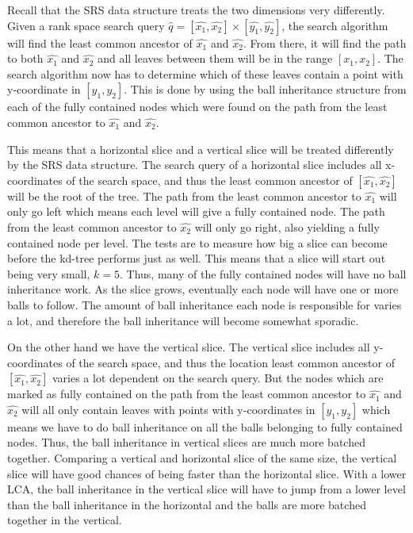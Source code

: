Recall that the SRS data structure treats the two dimensions very differently. Given a rank space search query $\hat{q} = [\hat{x_1}, \hat{x_2}] \times [\hat{y_1}, \hat{y_2}]$, the search algorithm will find the least common ancestor of $\hat{x_1}$ and $\hat{x_2}$. From there, it will find the path to both $\hat{x_1}$ and $\hat{x_2}$ and all leaves between them will be in the range $[x_1, x_2]$. The search algorithm now has to determine which of these leaves contain a point with y-coordinate in $[y_1, y_2]$. This is done by using the ball inheritance structure from each of the fully contained nodes which were found on the path from the least common ancestor to $\hat{x_1}$ and $\hat{x_2}$.

This means that a horizontal slice and a vertical slice will be treated differently by the SRS data structure. The search query of a horizontal slice includes all x-coordinates of the search space, and thus the least common ancestor of $[\hat{x_1}, \hat{x_2}]$ will be the root of the tree. The path from the least common ancestor to $\hat{x_1}$ will only go left which means each level will give a fully contained node. The path from the least common ancestor to $\hat{x_2}$ will only go right, also yielding a fully contained node per level. The tests are to measure how big a slice can become before the kd-tree performs just as well. This means that a slice will start out being very small, $k=5$. Thus, many of the fully contained nodes will have no ball inheritance work. As the slice grows, eventually each node will have one or more balls to follow. The amount of ball inheritance each node is responsible for varies a lot, and therefore the ball inheritance will become somewhat sporadic.

On the other hand we have the vertical slice. The vertical slice includes all y-coordinates of the search space, and thus the location least common ancestor of $[\hat{x_1}, \hat{x_2}]$ varies a lot dependent on the search query. But the nodes which are marked as fully contained on the path from the least common ancestor to $\hat{x_1}$ and $\hat{x_2}$ will all only contain leaves with points with y-coordinates in $[y_1, y_2]$ which means we have to do ball inheritance on all the balls belonging to fully contained nodes. Thus, the ball inheritance in vertical slices are much more batched together. Comparing a vertical and horizontal slice of the same size, the vertical slice will have good chances of being faster than the horizontal slice. With a lower LCA, the ball inheritance in the vertical slice will have to jump from a lower level than the ball inheritance in the horizontal and the balls are more batched together in the vertical. 


